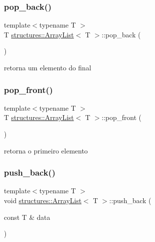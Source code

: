 \mbox{\label{classstructures_1_1ArrayList_ae9049f86f313cb35075218640e858f6d}} 
\subsubsection{\texorpdfstring{pop\_back()}{pop\_back()}}
{\footnotesize\ttfamily template$<$typename T $>$ \\
T \mbox{\hyperlink{classstructures_1_1ArrayList}{structures\+::\+Array\+List}}$<$ T $>$\+::pop\+\_\+back (\begin{DoxyParamCaption}{ }\end{DoxyParamCaption})}



retorna um elemento do final 

\mbox{\label{classstructures_1_1ArrayList_a8f8540ed89c0482099bf7768a668d4e5}} 
\subsubsection{\texorpdfstring{pop\_front()}{pop\_front()}}
{\footnotesize\ttfamily template$<$typename T $>$ \\
T \mbox{\hyperlink{classstructures_1_1ArrayList}{structures\+::\+Array\+List}}$<$ T $>$\+::pop\+\_\+front (\begin{DoxyParamCaption}{ }\end{DoxyParamCaption})}



retorna o primeiro elemento 

\mbox{\label{classstructures_1_1ArrayList_a48f49e0fc24d787f1d484cd72581f4c6}} 
\subsubsection{\texorpdfstring{push\_back()}{push\_back()}}
{\footnotesize\ttfamily template$<$typename T $>$ \\
void \mbox{\hyperlink{classstructures_1_1ArrayList}{structures\+::\+Array\+List}}$<$ T $>$\+::push\+\_\+back (\begin{DoxyParamCaption}\item[{const T \&}]{data }\end{DoxyParamCaption})}



